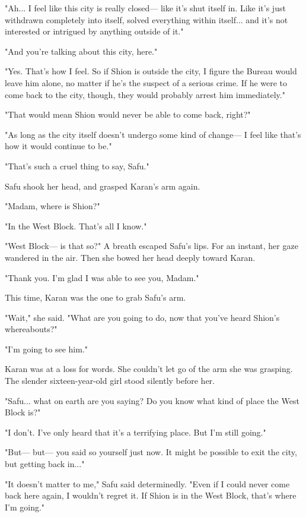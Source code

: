 "Ah... I feel like this city is really closed--- like it's shut itself in.
Like it's just withdrawn completely into itself, solved everything
within itself... and it's not interested or intrigued by anything
outside of it."

"And you're talking about this city, here."

"Yes. That's how I feel. So if Shion is outside the city, I figure the
Bureau would leave him alone, no matter if he's the suspect of a serious
crime. If he were to come back to the city, though, they would probably
arrest him immediately."

"That would mean Shion would never be able to come back, right?"

"As long as the city itself doesn't undergo some kind of change--- I feel
like that's how it would continue to be."

"That's such a cruel thing to say, Safu."

Safu shook her head, and grasped Karan's arm again.

"Madam, where is Shion?"

"In the West Block. That's all I know."

"West Block--- is that so?" A breath escaped Safu's lips. For an instant,
her gaze wandered in the air. Then she bowed her head deeply toward
Karan.

"Thank you. I'm glad I was able to see you, Madam."

This time, Karan was the one to grab Safu's arm.

"Wait," she said. "What are you going to do, now that you've heard
Shion's whereabouts?"

"I'm going to see him."

\mybreak

Karan was at a loss for words. She couldn't let go of the arm she was
grasping. The slender sixteen-year-old girl stood silently before her.

"Safu... what on earth are you saying? Do you know what kind of place
the West Block is?"

"I don't. I've only heard that it's a terrifying place. But I'm still
going."

"But--- but--- you said so yourself just now. It might be possible to exit
the city, but getting back in..."

"It doesn't matter to me," Safu said determinedly. "Even if I could
never come back here again, I wouldn't regret it. If Shion is in the
West Block, that's where I'm going."


